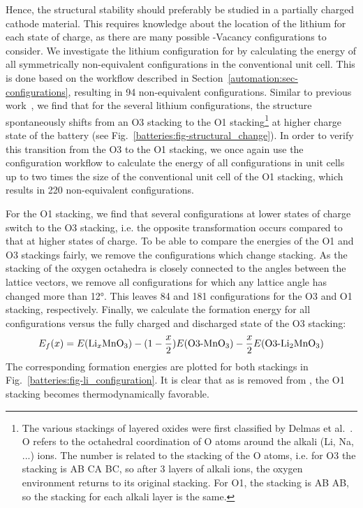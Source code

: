 \begin{refsection}
Hence, the structural stability should preferably be studied in a partially 
charged cathode material. This requires knowledge about the location of the 
lithium for each state of charge, as there are many possible -Vacancy 
configurations to consider. We investigate the lithium configuration for 
 by calculating the energy of all symmetrically non-equivalent 
configurations in the conventional unit cell. This is done based on the 
workflow described in Section~\ref{automation:sec-configurations}, resulting 
in 94 non-equivalent configurations. Similar to previous 
work~\cite{Koyama2009}, we find that for the several lithium configurations, 
the  structure spontaneously shifts from an O3 stacking to the O1 
stacking\footnote{The various stackings of layered oxides were first classified 
by Delmas et al.~\cite{Delmas1980}. O refers to the octahedral coordination 
of O atoms around the alkali (Li, Na, ...) ions. The number is related to 
the stacking of the O atoms, i.e. for O3 the stacking is AB CA BC, so after 
3 layers of alkali ions, the oxygen environment returns to its original 
stacking. For O1, the stacking is AB AB, so the stacking for each alkali 
layer is the same.} at higher charge state of the battery 
(see Fig.~\ref{batteries:fig-structural_change}). In order to verify this transition from 
the O3 to the O1 stacking, we once again use the configuration workflow to 
calculate the energy of all  configurations in unit cells up to two 
times the size of the conventional unit cell of the O1 stacking, which results 
in 220 non-equivalent configurations. 

For the O1 stacking, we find that 
several configurations at lower states of charge switch to the O3 stacking, 
i.e. the opposite transformation occurs compared to that at higher states of 
charge. To be able to compare the energies of the O1 and O3 stackings fairly, we 
remove the configurations which change stacking. As the stacking 
of the oxygen octahedra is closely connected to the angles between the 
lattice vectors, we remove all configurations for which any lattice angle has 
changed more than 12\si{\degree}. This leaves 84 and 181 configurations for 
the O3 and O1 stacking, respectively. Finally, we calculate the formation 
energy for all configurations versus the fully charged and discharged state of 
the O3 stacking: 
\begin{equation} 
E_f (x) = E(\ce{Li_xMnO3}) - (1 - \frac{x}{2}) E(\text{O3-}\ce{MnO3}) - 
\frac{x}{2} E(\text{O3-}\ce{Li2MnO3}) 
\end{equation} 
The corresponding formation energies are plotted for both stackings in 
Fig.~\ref{batteries:fig-li_configuration}. It is clear that as  is 
removed from , the O1 stacking becomes thermodynamically 
favorable. 
 

\end{refsection}
